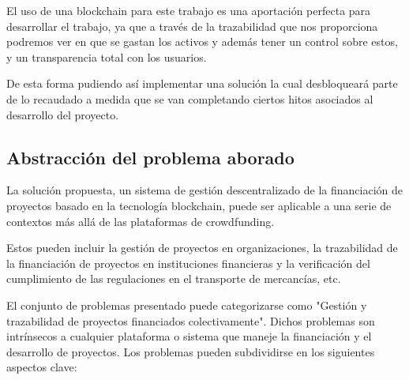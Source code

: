 El uso de una blockchain para este trabajo es una aportación perfecta para desarrollar el trabajo, ya que a través de la trazabilidad que nos proporciona podremos ver en que se gastan los activos y además tener un control sobre estos, y un transparencia total con los usuarios. 

\bigskip

De esta forma pudiendo así implementar una solución la cual desbloqueará parte de lo recaudado a medida que se van completando ciertos hitos asociados al desarrollo del proyecto.

\newpage

\subsection{Abstracción del problema aborado}

La solución propuesta, un sistema de gestión descentralizado de la financiación de proyectos basado en la tecnología blockchain, puede ser aplicable a una serie de contextos más allá de las plataformas de crowdfunding.

\bigskip

Estos pueden incluir la gestión de proyectos en organizaciones, la trazabilidad de la financiación de proyectos en instituciones financieras y la verificación del cumplimiento de las regulaciones en el transporte de mercancías, etc.

\bigskip

El conjunto de problemas presentado puede categorizarse como "Gestión y trazabilidad de proyectos financiados colectivamente". Dichos problemas son intrínsecos a cualquier plataforma o sistema que maneje la financiación y el desarrollo de proyectos. Los problemas pueden subdividirse en los siguientes aspectos clave:

\bigskip

